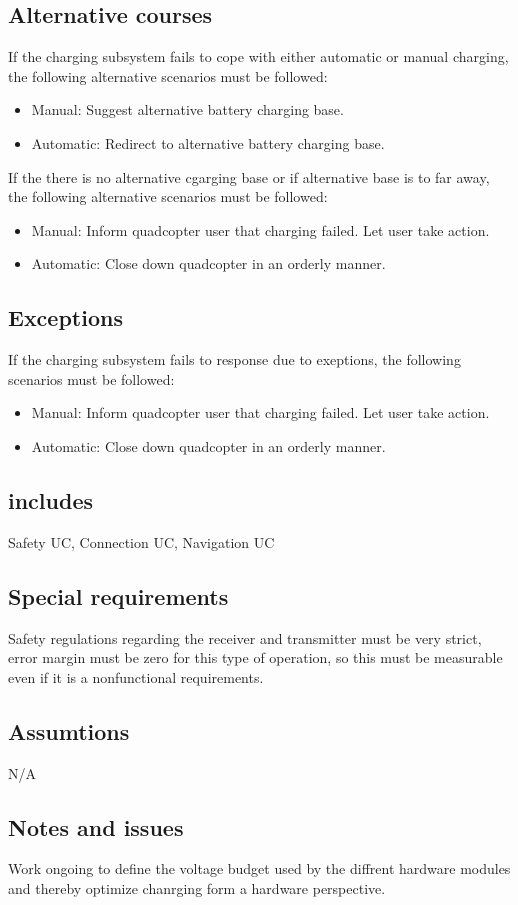 \documentclass[a4paper]{article}
\begin{document}
\subsection{Alternative courses}
If the charging subsystem fails to cope with either automatic or manual charging,
the following alternative scenarios must be followed:
\begin{itemize}
	\item Manual: Suggest alternative battery charging base.
	\item Automatic: Redirect to alternative battery charging base.
\end{itemize}
If the there is no alternative cgarging base or if alternative base is to far away,
the following alternative scenarios must be followed:
\begin{itemize}
	\item Manual: Inform quadcopter user that charging failed. Let user take action.
	\item Automatic: Close down quadcopter in an orderly manner.
\end{itemize}
\subsection{Exceptions}
If the charging subsystem fails to response due to exeptions, the following scenarios must be followed:
\begin{itemize}
	\item Manual: Inform quadcopter user that charging failed. Let user take action.
	\item Automatic: Close down quadcopter in an orderly manner.
\end{itemize}
\subsection{includes}
Safety UC, Connection UC, Navigation UC
\subsection{Special requirements}
Safety regulations regarding the receiver and transmitter must be very strict, error margin must be zero for this type of operation, so this must be measurable even if it is  a nonfunctional requirements. 
\subsection{Assumtions}
N/A
\subsection{Notes and issues}
Work ongoing to define the voltage budget used by the diffrent hardware modules and thereby optimize chanrging form a hardware perspective.
\end{document}
